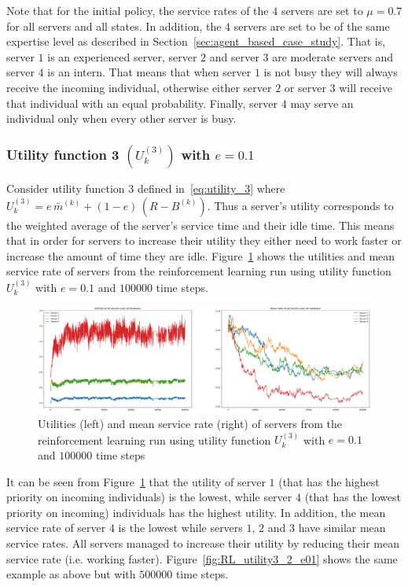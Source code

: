 Note that for the initial policy, the service rates of the \(4\) servers are
set to \(\mu = 0.7\) for all servers and all states.
In addition, the \(4\) servers are set to be of the same expertise level as
described in Section~\ref{sec:agent_based_case_study}.
That is, server \(1\) is an experienced server, server \(2\) and server
\(3\) are moderate servers and server \(4\) is an intern.
That means that when server \(1\) is not busy they will always receive the
incoming individual, otherwise either server \(2\) or server \(3\) will
receive that individual with an equal probability.
Finally, server \(4\) may serve an individual only when every other server is
busy.


\subsubsection{Utility function 3 \((U_k^{(3)})\) with \(e = 0.1\)}
\label{sec:utility_3_results}

Consider utility function 3 defined in~\eqref{eq:utility_3} where
\(U_k^{(3)} = e \, \bar{m}^{(k)} + (1 - e) \, (R - B^{(k)})\).
Thus a server's utility corresponds to the weighted average of the server's
service time and their idle time.
This means that in order for servers to increase their utility they either
need to work faster or increase the amount of time they are idle.
Figure~\ref{fig:RL_utility3_1_e01} shows the utilities and mean service rate
of servers from the reinforcement learning run using utility function
\(U_k^{(3)}\) with \(e = 0.1\) and \(100000\) time steps.

\begin{figure}[H]
    \includegraphics[width=\textwidth]{chapters/06_agent_based_extension/Bin/reinforcement_learning_results/utility_3/u3_1_e01.pdf}
    \caption{Utilities (left) and mean service rate (right) of servers from the
    reinforcement learning run using utility function \(U_k^{(3)}\) with
    \(e = 0.1\) and \(100000\) time steps}
    \label{fig:RL_utility3_1_e01}
\end{figure}

It can be seen from Figure~\ref{fig:RL_utility3_1_e01} that the utility of
server \(1\) (that has the highest priority on incoming individuals) is the
lowest, while server \(4\) (that has the lowest priority on incoming)
individuals has the highest utility.
In addition, the mean service rate of server \(4\) is the lowest while servers
\(1\), \(2\) and \(3\) have similar mean service rates.
All servers managed to increase their utility by reducing their mean service
rate (i.e. working faster).
Figure~\ref{fig:RL_utility3_2_e01} shows the same example as above but with
\(500000\) time steps.


